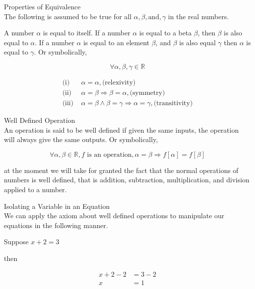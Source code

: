 \documentclass{book}
\begin{document}
  {\axiom Properties of Equivalence \\
     The following is assumed to be true for all $\alpha, \beta, \text{and}, \gamma$ in the real numbers.

     A number $\alpha$ is equal to itself. If a number $\alpha$ is equal to a beta $\beta$, then $\beta$ is also equal to $\alpha$. If a number $\alpha$ is equal to an element $\beta$, and $\beta$ is also equal $\gamma$ then $\alpha$ is equal to $\gamma$. Or symbolically,

    $$\forall \alpha, \beta, \gamma \in \mathbb{R}$$

    \begin{align*}
      \text{(i) } & \alpha = \alpha, \text{(relexivity)}\\
      \text{(ii) } & \alpha = \beta \Rightarrow \beta = \alpha, \text{(symmetry)}\\
      \text{(iii) } & \alpha = \beta \land \beta = \gamma \Rightarrow \alpha = \gamma, \text{(transitivity)}
    \end{align*}
  }

  {\axiom Well Defined Operation \\
     An operation is said to be well defined if given the same inputs, the operation will always give the same outputs. Or symbolically,

    $$\forall \alpha, \beta \in \mathbb{R}, f \text{ is an operation}, \alpha = \beta \Rightarrow f[\alpha] = f[\beta]$$

     at the moment we will take for granted the fact that the normal operations of numbers is well defined, that is addition, subtraction, multiplication, and division applied to a number.\\
  }

  {\remark Isolating a Variable in an Equation \\
     We can apply the axiom about well defined operations to manipulate our  equations in the following manner.

     Suppose $x + 2 = 3$

     then

    \begin{align}
      x + 2 - 2 & = 3 - 2\\
      x & = 1
    \end{align}
  }
\end{document}
